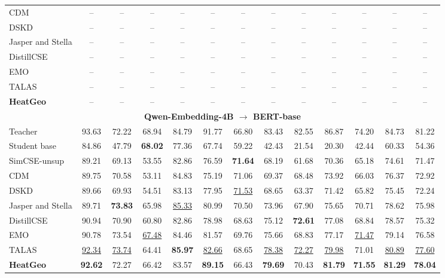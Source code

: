 \begin{table}[t]
\begin{tabular}{l|ccc|ccc|ccc|cc|c}
\hline
CDM & -- & -- & -- & -- & -- & -- & -- & -- & -- & -- & -- & -- \\
DSKD & -- & -- & -- & -- & -- & -- & -- & -- & -- & -- & -- & -- \\
Jasper and Stella & -- & -- & -- & -- & -- & -- & -- & -- & -- & -- & -- & -- \\
DistillCSE & -- & -- & -- & -- & -- & -- & -- & -- & -- & -- & -- & -- \\
EMO & -- & -- & -- & -- & -- & -- & -- & -- & -- & -- & -- & -- \\
TALAS & -- & -- & -- & -- & -- & -- & -- & -- & -- & -- & -- & -- \\
\textbf{HeatGeo} & -- & -- & -- & -- & -- & -- & -- & -- & -- & -- & -- & -- \\
\hline
\multicolumn{13}{c}{\textbf{Qwen-Embedding-4B $\rightarrow$ BERT-base}} \\
\hline
Teacher & 93.63 & 72.22 & 68.94 & 84.79 & 91.77 & 66.80 & 83.43 & 82.55 & 86.87 & 74.20 & 84.73 & 81.22 \\
Student base & 84.86 & 47.79 & \textbf{68.02} & 77.36 & 67.74 & 59.22 & 42.43 & 21.54 & 20.30 & 42.44 & 60.33 & 54.36 \\
SimCSE-unsup & 89.21 & 69.13 & 53.55 & 82.86 & 76.59 & \textbf{71.64} & 68.19 & 61.68 & 70.36 & 65.18 & 74.61 & 71.47 \\
\hline
CDM & 89.75 & 70.58 & 53.11 & 84.83 & 75.19 & 71.06 & 69.37 & 68.48 & 73.92 & 66.03 & 76.37 & 72.92 \\
DSKD & 89.66 & 69.93 & 54.51 & 83.13 & 77.95 & \underline{71.53} & 68.65 & 63.37 & 71.42 & 65.82 & 75.45 & 72.24 \\
Jasper and Stella & 89.71 & \textbf{73.83} & 65.98 & \underline{85.33} & 80.99 & 70.50 & 73.96 & 67.90 & 75.65 & 70.71 & 78.62 & 75.98 \\
DistillCSE & 90.94 & 70.90 & 60.80 & 82.86 & 78.98 & 68.63 & 75.12 & \textbf{72.61} & 77.08 & 68.84 & 78.57 & 75.32 \\
EMO & 90.78 & 73.54 & \underline{67.48} & 84.46 & 81.57 & 69.76 & 75.66 & 68.83 & 77.17 & \underline{71.47} & 79.14 & 76.58 \\
TALAS & \underline{92.34} & \underline{73.74} & 64.41 & \textbf{85.97} & \underline{82.66} & 68.65 & \underline{78.38} & \underline{72.27} & \underline{79.98} & 71.01 & \underline{80.89} & \underline{77.60} \\
\textbf{HeatGeo} & \textbf{92.62} & 72.27 & 66.42 & 83.57 & \textbf{89.15} & 66.43 & \textbf{79.69} & 70.43 & \textbf{81.79} & \textbf{71.55} & \textbf{81.29} & \textbf{78.04} \\
\hline
\end{tabular}
\end{table}
